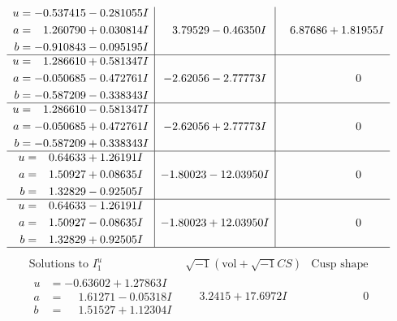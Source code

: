 \documentclass[1p]{elsarticle_modified}
\theoremstyle{definition}
\newcommand{\I}{\sqrt{-1}}
\begin{document}
$$\begin{array}{c|c|c}
\begin{aligned}
u &= -0.537415 - 0.281055 I \\
a &= \phantom{-}1.260790 + 0.030814 I \\
b &= -0.910843 - 0.095195 I\end{aligned}
 & \phantom{-}3.79529 - 0.46350 I & \phantom{-}6.87686 + 1.81955 I \\ \hline\begin{aligned}
u &= \phantom{-}1.286610 + 0.581347 I \\
a &= -0.050685 - 0.472761 I \\
b &= -0.587209 - 0.338343 I\end{aligned}
 & -2.62056 - 2.77773 I & \phantom{-0.000000 } 0 \\ \hline\begin{aligned}
u &= \phantom{-}1.286610 - 0.581347 I \\
a &= -0.050685 + 0.472761 I \\
b &= -0.587209 + 0.338343 I\end{aligned}
 & -2.62056 + 2.77773 I & \phantom{-0.000000 } 0 \\ \hline\begin{aligned}
u &= \phantom{-}0.64633 + 1.26191 I \\
a &= \phantom{-}1.50927 + 0.08635 I \\
b &= \phantom{-}1.32829 - 0.92505 I\end{aligned}
 & -1.80023 - 12.03950 I & \phantom{-0.000000 } 0 \\ \hline\begin{aligned}
u &= \phantom{-}0.64633 - 1.26191 I \\
a &= \phantom{-}1.50927 - 0.08635 I \\
b &= \phantom{-}1.32829 + 0.92505 I\end{aligned}
 & -1.80023 + 12.03950 I & \phantom{-0.000000 } 0\\
 \hline 
 \end{array}$$\newpage$$\begin{array}{c|c|c}  
\text{Solutions to }I^u_{1}& \I (\text{vol} + \sqrt{-1}CS) & \text{Cusp shape}\\
 \hline 
\begin{aligned}
u &= -0.63602 + 1.27863 I \\
a &= \phantom{-}1.61271 - 0.05318 I \\
b &= \phantom{-}1.51527 + 1.12304 I\end{aligned}
 & \phantom{-}3.2415 + 17.6972 I & \phantom{-0.000000 } 0 \\ \hline\begin{aligned}

\end{aligned}
\end{array}$$
\end{document}
